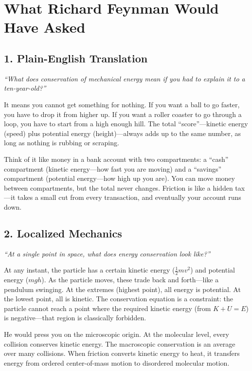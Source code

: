 \documentclass[11pt,openright]{book}
\begin{document}
\section*{What Richard Feynman Would Have Asked}

\subsection*{1. Plain-English Translation}
\textit{``What does conservation of mechanical energy mean if you had to explain it to a ten-year-old?''}

It means you cannot get something for nothing. If you want a ball to go faster, you have to drop it from higher up. If you want a roller coaster to go through a loop, you have to start from a high enough hill. The total ``score''---kinetic energy (speed) plus potential energy (height)---always adds up to the same number, as long as nothing is rubbing or scraping.

Think of it like money in a bank account with two compartments: a ``cash'' compartment (kinetic energy---how fast you are moving) and a ``savings'' compartment (potential energy---how high up you are). You can move money between compartments, but the total never changes. Friction is like a hidden tax---it takes a small cut from every transaction, and eventually your account runs down.

\subsection*{2. Localized Mechanics}
\textit{``At a single point in space, what does energy conservation look like?''}

At any instant, the particle has a certain kinetic energy ($\frac{1}{2}mv^2$) and potential energy ($mgh$). As the particle moves, these trade back and forth---like a pendulum swinging. At the extremes (highest point), all energy is potential. At the lowest point, all is kinetic. The conservation equation is a constraint: the particle cannot reach a point where the required kinetic energy (from $K + U = E$) is negative---that region is classically forbidden.

He would press you on the microscopic origin. At the molecular level, every collision conserves kinetic energy. The macroscopic conservation is an average over many collisions. When friction converts kinetic energy to heat, it transfers energy from ordered center-of-mass motion to disordered molecular motion.
\end{document}
